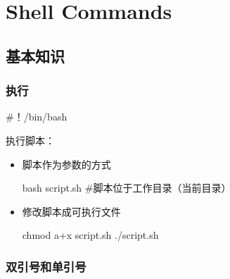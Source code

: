 \chapter{Shell Commands}

\section{基本知识}

\subsection{执行}

\begin{Bash}[开头告诉shell使用什么bash]
#！/bin/bash
\end{Bash}


执行脚本：

\begin{itemize}
\item 脚本作为参数的方式
\begin{Bash}
bash script.sh   #脚本位于工作目录（当前目录）
\end{Bash}

\item 修改脚本成可执行文件

\begin{Bash}[内核会读取首行来确定执行的bash]
chmod a+x script.sh
./script.sh
\end{Bash}

\end{itemize}

\subsection{双引号和单引号}